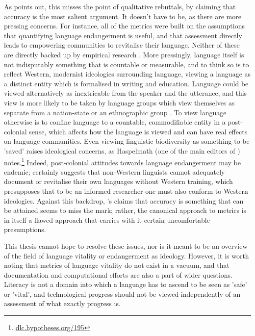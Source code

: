 As \citet{grenoble2016response} points out, this misses the point of qualitative rebuttals, by claiming that accuracy is the most salient argument. It doesn't have to be, as there are more pressing concerns. For instance, all of the metrics were built on the assumptions that quantifying language endangerment is useful, and that assessment directly leads to empowering communities to revitalise their language. Neither of these are directly backed up by empirical research \citep{grenoble2016response}. More pressingly, language itself is not indisputably something that is countable or measurable, and to think so is to reflect Western, modernist ideologies surrounding language, viewing a language as a distinct entity which is formalised in writing and education. Language could be viewed alternatively as inextricable from the speaker and the utterance, and this view is more likely to be taken by language groups which view themselves as separate from a nation-state or an ethnographic group \citep{bodo2017language}. To view language otherwise is to confine language to a countable, commodifiable entity in a post-colonial sense, which affects how the language is viewed and can have real effects on language communities. Even viewing linguistic biodiversity as something to be 'saved' raises ideological  concerns, as Haspelmath (one of the main editors of \citet{wals}) notes.\footnote{\href{dlc.hypotheses.org/195}{dlc.hypotheses.org/195}} Indeed, post-colonial attitudes towards language endangerment may be endemic; \citet{newman1998we} certainly suggests that non-Western linguists cannot adequately document or revitalise their own languages without Western training, which presupposes that to be an informed researcher one must also conform to Western ideologies. Against this backdrop, \citet{lee2016assessing}'s claims that accuracy is something that can be attained seems to miss the mark; rather, the canonical approach to metrics is in itself a flawed approach that carries with it certain uncomfortable presumptions.

This thesis cannot hope to resolve these issues, nor is it meant to be an overview of the field of language vitality or endangerment as ideology. However, it is worth noting that metrics of language vitality do not exist in a vacuum, and that documentation and computational efforts are also a part of wider questions. Literacy is not a domain into which a language has to ascend to be seen as 'safe' or 'vital', and technological progress should not be viewed independently of an assessment of what exactly progress is.

